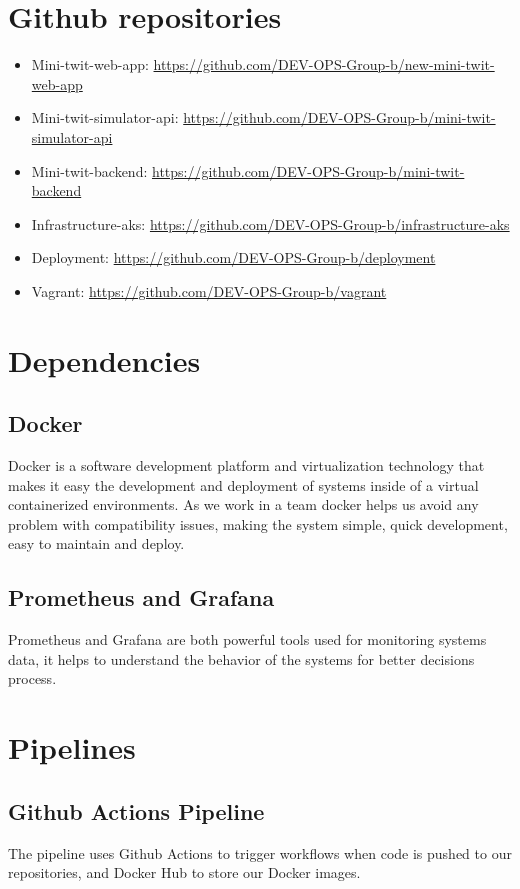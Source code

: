 \section{Github repositories}
\begin{itemize}
    \item Mini-twit-web-app: \url{https://github.com/DEV-OPS-Group-b/new-mini-twit-web-app}
    \item Mini-twit-simulator-api: \url{https://github.com/DEV-OPS-Group-b/mini-twit-simulator-api}
    \item Mini-twit-backend: \url{https://github.com/DEV-OPS-Group-b/mini-twit-backend}
    \item Infrastructure-aks: \url{https://github.com/DEV-OPS-Group-b/infrastructure-aks}
    \item Deployment: \url{https://github.com/DEV-OPS-Group-b/deployment}
    \item Vagrant: \url{https://github.com/DEV-OPS-Group-b/vagrant}
\end{itemize}

\section{Dependencies}\label{sec:dependencies}
\subsection{Docker}
Docker is a software development platform and virtualization technology that makes it easy the development and deployment of systems inside of  a virtual containerized environments. As we work in a team docker helps us avoid any problem with compatibility issues, making the system simple, quick development, easy to maintain and deploy.

\subsection{Prometheus and Grafana}
Prometheus and Grafana are both powerful tools used for monitoring systems data, it helps to understand the behavior of the systems for better decisions process.

\section{Pipelines}\label{sec:Pipelines}
\subsection{Github Actions Pipeline}\label{subsec: GithubActionsPipeline}
The pipeline uses Github Actions to trigger workflows when code is pushed to our repositories, and Docker Hub to store our Docker images.

